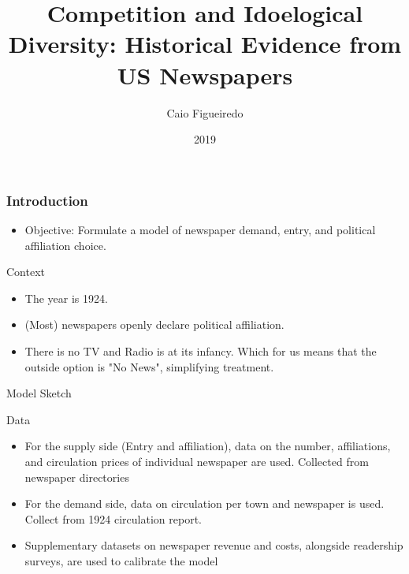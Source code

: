 \documentclass{beamer}
\title{Competition and Idoelogical Diversity: Historical Evidence from US Newspapers}
\author{Caio Figueiredo}
\institute{Penn State}
\date{2019}
\begin{document}
 
\frame{\titlepage}
 
\begin{frame}
  \frametitle{Introduction}
  \begin{itemize}
    \item Objective: Formulate a model of newspaper demand, entry, and political affiliation choice.
  \end{itemize}

\end{frame}

\begin{frame}[t]{Context}
  \begin{itemize}
    \item The year is 1924.
    \item (Most) newspapers openly declare political affiliation.
    \item There is no TV and Radio is at its infancy. Which for us means 
      that the outside option is "No News", simplifying treatment.
  \end{itemize}
\end{frame}

\begin{frame}[t]{Model Sketch}
  \center{}
\end{frame}

\begin{frame}[t]{Data}
  \begin{itemize}
    \item For the supply side (Entry and affiliation), data on the number,
      affiliations, and circulation prices of individual newspaper are used.
      \subitem Collected from newspaper directories
    \item For the demand side, data on circulation per town and newspaper
      is used.
      \subitem Collect from 1924 circulation report.
    \item Supplementary datasets on newspaper revenue and costs, alongside readership
      surveys, are used to calibrate the model
  \end{itemize}
\end{frame}
\end{document}
